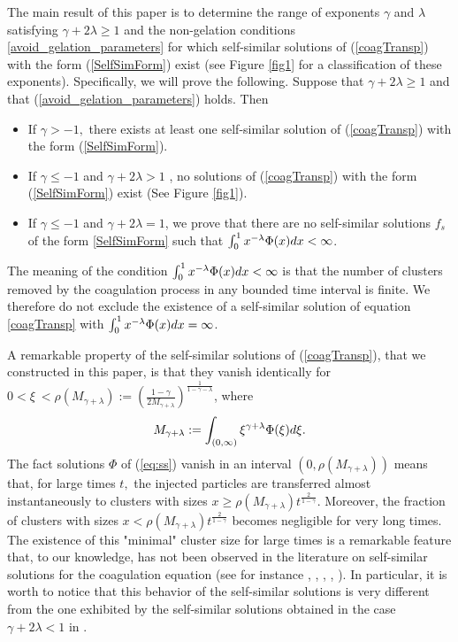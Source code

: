 \documentclass[11pt]{article}
\numberwithin{equation}{section}
\theoremstyle{plain}
\newcommand{\der}{\textup{d}}
\begin{document}
 The main result of this paper is to determine the range
of exponents $\gamma$ and $\lambda$ satisfying $\gamma+2\lambda\geq1$ and the non-gelation conditions \eqref{avoid_gelation_parameters} for which self-similar solutions of
(\ref{coagTransp}) with the form (\ref{SelfSimForm})
exist (see Figure \ref{fig1} for a classification of these exponents). Specifically, we will prove the following. Suppose that $\gamma
+2\lambda\geq1$  and that (\ref{avoid_gelation_parameters}) holds. Then

\begin{itemize}
\item If $\gamma>-1,$ there exists at least one self-similar solution of
(\ref{coagTransp}) with the form (\ref{SelfSimForm}).
\item If $\gamma\leq -1$ and $\gamma +2\lambda >1$ , no solutions of (\ref{coagTransp}) with the form
(\ref{SelfSimForm}) exist (See Figure \ref{fig1}).
\item If $\gamma\leq -1$ and $\gamma +2\lambda =1$, we prove that there are no self-similar solutions $f_{s}$ of the form \eqref{SelfSimForm} such that $\int_0^1 x^{-\lambda} \Phi(x) \der x  < \infty$.
\end{itemize}


The meaning of the condition $\int_0^1 x^{-\lambda} \Phi(x) \der x < \infty$ is that the number of clusters removed by the coagulation process in any bounded time interval is finite.
We therefore do not exclude the existence of a self-similar solution of equation \eqref{coagTransp} with $\int_0^1 x^{-\lambda} \Phi(x) \der x = \infty$. 

A remarkable property of the self-similar solutions of (\ref{coagTransp}), that we constructed in this paper, is that they vanish identically for $0<\xi\ < 
\rho(M_{\gamma+\lambda}):=\left( \frac{1-\gamma}{2 M_{\gamma +\lambda}}\right)^{\frac{1}{1-\gamma -\lambda} }$, where
\begin{align*}
    M_{\gamma +\lambda} :=\int_{(0,\infty)}\xi^{\gamma+\lambda}\Phi(\xi) \der\xi.
\end{align*}
The fact solutions $\Phi$ of (\ref{eq:ss}) vanish in an interval $(0,\rho(M_{\gamma+\lambda}))$ means that, for large
times $t,$ the injected particles are transferred almost instantaneously to
clusters with sizes $x\geq\rho(M_{\gamma+\lambda}) t^{\frac{2}{1-\gamma}}.$ Moreover, the fraction
of clusters with sizes $x< \rho(M_{\gamma+\lambda}) t^{\frac{2}{1-\gamma}}$ becomes negligible
for very long times. The existence of this "minimal" cluster size for large
times is a remarkable feature that, to our knowledge, has not been observed in the literature on self-similar solutions for the coagulation equation (see for instance \cite{escobedo2006dust}, \cite{escobedo2005self}, \cite{fournier2006local}, \cite{menon2004approach}, \cite{hungtruong}).
In particular, it is worth to notice that this
behavior of the self-similar solutions is very different from the one
exhibited by the self-similar solutions obtained in the case $\gamma
+2\lambda<1$ in \cite{ferreira2021self}.
\end{document}
